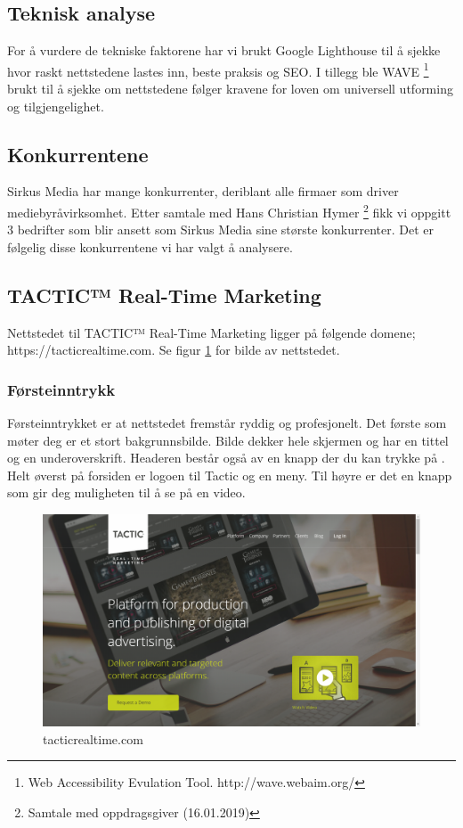 \subsection{Teknisk analyse}
For å vurdere de tekniske faktorene har vi brukt Google Lighthouse til å sjekke hvor raskt nettstedene lastes inn, beste praksis og SEO. I tillegg ble WAVE \footnote{Web Accessibility Evulation Tool. http://wave.webaim.org/} brukt til å sjekke om nettstedene følger kravene for loven om universell utforming og tilgjengelighet.

\subsection{Konkurrentene}
Sirkus Media har mange konkurrenter, deriblant alle firmaer som driver mediebyråvirksomhet. Etter samtale med Hans Christian Hymer \footnote{Samtale med oppdragsgiver (16.01.2019)} fikk vi oppgitt 3 bedrifter som blir ansett som Sirkus Media sine største konkurrenter. Det er følgelig disse konkurrentene vi har valgt å analysere.

\subsection{TACTIC™ Real-Time Marketing}
Nettstedet til TACTIC™ Real-Time Marketing ligger på følgende domene; https://tacticrealtime.com. Se figur \ref{fig:competitors-tacticrealtime.com} for bilde av nettstedet.

\subsubsection{Førsteinntrykk}
Førsteinntrykket er at nettstedet fremstår ryddig og profesjonelt. Det første som møter deg er et stort bakgrunnsbilde. Bilde dekker hele skjermen og har en tittel og en underoverskrift. Headeren består også av en knapp der du kan trykke på . Helt øverst på forsiden er logoen til Tactic og en meny. Til høyre er det en knapp som gir deg muligheten til å se på en video. 

\begin{figure}[H]
    \centering
    \includegraphics[width=\textwidth]{line/tacticrealtime_com_(1366x768).png}
    \caption{tacticrealtime.com}
    \label{fig:competitors-tacticrealtime.com}
\end{figure}

